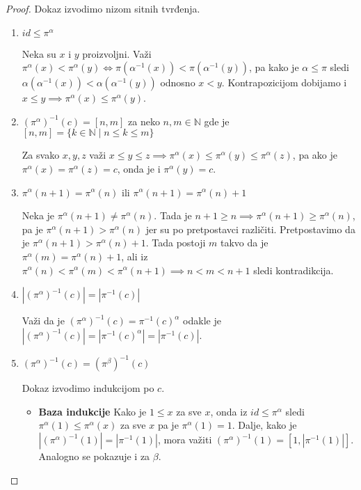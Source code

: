 \documentclass[12pt,oneside]{memoir}
\theoremstyle{definition}
\begin{document}
  \begin{proof}
	  Dokaz izvodimo nizom sitnih tvrđenja.

	  \begin{enumerate}
		  \item $id \leq \pi^\alpha$

			  Neka su $x$ i $y$ proizvoljni. Važi $\pi^\alpha(x) <
			  \pi^\alpha(y) \iff \pi(\alpha^{-1}(x)) < \pi(\alpha^{-1}(y))$, pa
			  kako je $\alpha \leq \pi$ sledi $\alpha(\alpha^{-1}(x)) <
			  \alpha(\alpha^{-1}(y))$ odnosno $x < y$. Kontrapozicijom dobijamo
			  i $x \leq y \implies \pi^\alpha(x) \leq \pi^\alpha(y)$.

		  \item $(\pi^\alpha)^{-1}(c) = [n, m]$ za neko $n, m \in \mathbb{N}$
			  gde je $[n, m] = \{k \in \mathbb{N} \mid n \leq k \leq m\}$

			  Za svako $x, y, z $ važi $x \leq y \leq z \implies \pi^\alpha(x)
			  \leq \pi^\alpha(y) \leq \pi^\alpha(z)$, pa ako je $\pi^\alpha(x)
			  = \pi^\alpha(z) = c$, onda je i $\pi^\alpha(y) = c$.

		  \item $\pi^\alpha(n + 1) = \pi^\alpha(n)$ ili $\pi^\alpha(n+1) =
			  \pi^\alpha(n) + 1$

			  Neka je $\pi^\alpha(n+1) \neq \pi^\alpha(n)$. Tada je $n + 1 \geq
			  n \implies \pi^\alpha(n+1) \geq \pi^\alpha(n)$, pa je
			  $\pi^\alpha(n+1) > \pi^\alpha(n)$ jer su po pretpostavci
			  različiti. Pretpostavimo da je $\pi^\alpha(n+1) > \pi^\alpha(n) +
			  1$. Tada postoji $m$ takvo da je $\pi^\alpha(m) = \pi^\alpha(n) +
			  1$, ali iz $\pi^\alpha(n) < \pi^\alpha(m) < \pi^\alpha(n+1)
			  \implies n < m < n + 1$ sledi kontradikcija.

		  \item $|(\pi^\alpha)^{-1}(c)| = |\pi^{-1}(c)|$

			  Važi da je $(\pi^\alpha)^{-1}(c) = \pi^{-1}(c)^\alpha$ odakle je
			  $|(\pi^\alpha)^{-1}(c)| = |\pi^{-1}(c)^\alpha| = |\pi^{-1}(c)|$.

		  \item $(\pi^\alpha)^{-1}(c) = (\pi^\beta)^{-1}(c)$

			  Dokaz izvodimo indukcijom po $c$.

			  \begin{itemize}
				  \item[] \textbf{Baza indukcije} Kako je $1 \leq x$ za sve
					  $x$, onda iz $id \leq \pi^\alpha$ sledi $\pi^\alpha(1)
					  \leq \pi^\alpha(x)$ za sve $x$ pa je $\pi^\alpha(1) = 1$.
					  Dalje, kako je $|(\pi^\alpha)^{-1}(1)| = |\pi^{-1}(1)|$,
					  mora važiti $(\pi^\alpha)^{-1}(1) = [1, |\pi^{-1}(1)|]$.
					  Analogno se pokazuje i za $\beta$.


\end{itemize}
\end{enumerate}
\end{proof}
\end{document}
